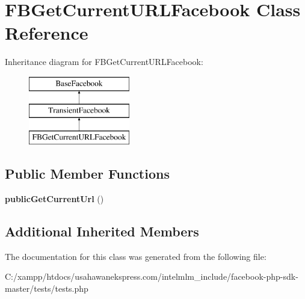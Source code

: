 \hypertarget{class_f_b_get_current_u_r_l_facebook}{\section{F\-B\-Get\-Current\-U\-R\-L\-Facebook Class Reference}
\label{class_f_b_get_current_u_r_l_facebook}
}
Inheritance diagram for F\-B\-Get\-Current\-U\-R\-L\-Facebook\-:\begin{figure}[H]
\begin{center}
\leavevmode
\includegraphics[height=3.000000cm]{class_f_b_get_current_u_r_l_facebook}
\end{center}
\end{figure}
\subsection*{Public Member Functions}
\begin{DoxyCompactItemize}
\item 
\hypertarget{class_f_b_get_current_u_r_l_facebook_a19c4d147a847a663fb8e2e471c85830c}{{\bfseries public\-Get\-Current\-Url} ()}\label{class_f_b_get_current_u_r_l_facebook_a19c4d147a847a663fb8e2e471c85830c}

\end{DoxyCompactItemize}
\subsection*{Additional Inherited Members}


The documentation for this class was generated from the following file\-:\begin{DoxyCompactItemize}
\item 
C\-:/xampp/htdocs/usahawanekspress.\-com/intelmlm\-\_\-include/facebook-\/php-\/sdk-\/master/tests/tests.\-php\end{DoxyCompactItemize}
